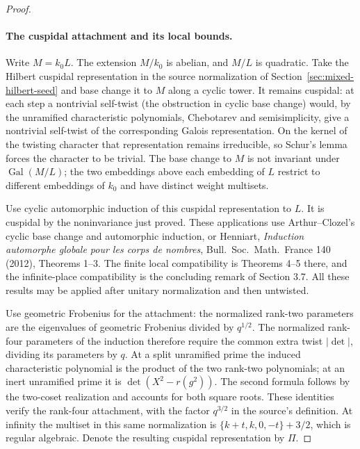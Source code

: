 \begin{proof}
\paragraph{The cuspidal attachment and its local bounds.}
Write \(M=k_0L\). The extension \(M/k_0\) is abelian, and
\(M/L\) is quadratic. Take the Hilbert cuspidal representation
in the source normalization of Section~\ref{sec:mixed-hilbert-seed}
and base change it to \(M\) along a cyclic tower. It remains
cuspidal: at each step a nontrivial self-twist (the obstruction
in cyclic base change) would, by the unramified characteristic
polynomials, Chebotarev and semisimplicity, give a nontrivial
self-twist of the corresponding Galois representation. On the
kernel of the twisting character that representation remains
irreducible, so Schur's lemma forces the character to be trivial.
The base change to \(M\) is not invariant under
\(\operatorname{Gal}(M/L)\); the two embeddings above each
embedding of \(L\) restrict to different embeddings of \(k_0\)
and have distinct weight multisets.

Use cyclic automorphic induction of this cuspidal representation
to \(L\). It is cuspidal by the noninvariance just proved.
These applications use Arthur--Clozel's cyclic base change and
automorphic induction, or Henniart, \emph{Induction automorphe
globale pour les corps de nombres}, Bull.\ Soc.\ Math.\ France
140 (2012), Theorems 1--3. The finite local compatibility is
Theorems 4--5 there, and the infinite-place compatibility is
the concluding remark of Section 3.7. All these results may
be applied after unitary normalization and then untwisted.

Use geometric Frobenius for the attachment: the normalized
rank-two parameters are the eigenvalues of geometric Frobenius
divided by \(q^{1/2}\). The normalized rank-four parameters
of the induction therefore require the common extra twist
\(|\det|\), dividing its parameters by \(q\).
At a split unramified prime the induced characteristic polynomial
is the product of the two rank-two polynomials; at an inert
unramified prime it is \(\det(X^2-r(g^2))\). The second formula
follows by the two-coset realization and accounts for both square
roots. These identities verify the rank-four attachment, with
the factor \(q^{3/2}\) in the source's definition.
At infinity the multiset in this same normalization is
\(\{k+t,k,0,-t\}+3/2\), which is regular algebraic.
Denote the resulting cuspidal representation by \(\Pi\).


\end{proof}
